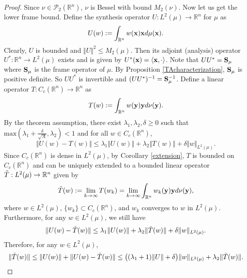 \documentclass{amsart}
\numberwithin{equation}{section}
\theoremstyle{plain}
\theoremstyle{definition}
\begin{document}
\begin{proof}
Since $\nu \in \mathcal{P}_2(\mathbb{R}^n)$, $\nu$ is Bessel  with bound $M_2(\nu)$. Now let us get the lower frame bound. Define the synthesis operator $U:L^2(\mu) \rightarrow \mathbb{R}^n$ for $\mu$ as 
\begin{equation*}
    U(w) := \int_{\mathbb{R}^n} w({\bf x}) {\bf x} d\mu({\bf x}).
    \end{equation*}
Clearly, $U$ is bounded and $\Vert U \Vert^2 \leq M_2(\mu)$. Then its adjoint (analysis) operator $U^*: \mathbb{R}^n \rightarrow L^2(\mu)$ exists and is given by $U^*({\bf x}) = \langle {\bf x}, \cdot \rangle$. Note that $UU^* = {\bf S}_{\mu}$ where ${\bf S}_{\mu}$ is the frame operator of $\mu$. By Proposition \ref{TAcharacterization}, ${\bf S}_{\mu}$ is positive definite. 
So $UU^*$ is invertible and $(UU^*)^{-1} = {\bf S}_{\mu}^{-1}$. Define  a linear operator $T: C_c(\mathbb{R}^n) \rightarrow \mathbb{R}^n$ as
\begin{equation*}
    T(w) := \int_{\mathbb{R}^n} w({\bf y}) {\bf y} d\nu({\bf y}).
\end{equation*}
By the theorem assumption, there exist  $\lambda_1,\lambda_2, \delta \geq 0$ such that $\mathrm{max} (\lambda_1 + \frac{\delta}{\sqrt{A}}, \lambda_2) <1$ and for all $w \in C_c(\mathbb{R}^n)$,
\begin{equation*}
    \Vert U(w) - T(w) \Vert \leq \lambda_1 \Vert U(w)  \Vert + \lambda_2  \Vert T(w) \Vert + \delta  \Vert  w \Vert_{L^2(\mu)} .
    \end{equation*}
Since $C_c(\mathbb{R}^n)$ is dense in $L^2(\mu)$, by Corollary \ref{extension}, $T$ is bounded on $C_c(\mathbb{R}^n)$ and can be uniquely extended to a bounded linear operator $\Tilde{T}: L^2(\mu) \rightarrow \mathbb{R}^n$ given by 
$$
 \Tilde{T}(w) := \lim_{k \rightarrow \infty} T(w_k) = \lim_{k \rightarrow \infty} \int_{\mathbb{R}^n} w_k({\bf y}) {\bf y} d\nu({\bf y}),
$$
where $w \in L^2(\mu)$, $\{w_k\} \subset C_c(\mathbb{R}^n)$, and $w_k$ converges to $w$ in $L^2(\mu)$. Furthermore, for any $w \in L^2(\mu)$, we still have
\begin{equation}\label{PaleyWienerType2}
    \Vert U(w) - \Tilde{T}(w) \Vert \leq \lambda_1 \Vert U(w)  \Vert + \lambda_2  \Vert \Tilde{T}(w) \Vert + \delta  \Vert  w \Vert_{L^2(\mu)} .
    \end{equation}
Therefore, for any $w \in L^2(\mu)$,
\begin{equation*}
       \Vert \Tilde{T}(w)  \Vert \leq   \Vert U(w)  \Vert +    \Vert U(w) - \Tilde{T}(w)  \Vert \leq \big((\lambda_1 +1)  \Vert U  \Vert +\delta  \big) \Vert  w \Vert_{L^2(\mu)} + \lambda_2\Vert \Tilde{T}(w)  \Vert.

\end{equation*}
\end{proof}
\end{document}
